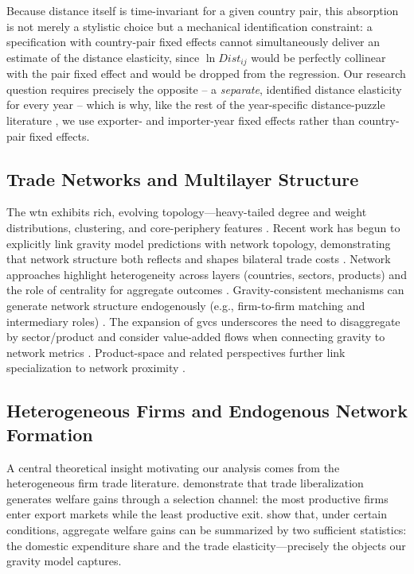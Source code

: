 \documentclass[preprint, 3p,
authoryear]{elsarticle} %
\begin{document}
Because distance itself is time-invariant for a given country pair, this
absorption is not merely a stylistic choice but a mechanical
identification constraint: a specification with country-pair fixed
effects cannot simultaneously deliver an estimate of the distance
elasticity, since \(\ln Dist_{ij}\) would be perfectly collinear with
the pair fixed effect and would be dropped from the regression. Our
research question requires precisely the opposite -- a
\textit{separate}, identified distance elasticity for every year --
which is why, like the rest of the year-specific distance-puzzle
literature \citep{disdier2008, brun2005, yotov2012distance}, we use
exporter- and importer-year fixed effects rather than country-pair fixed
effects.

\subsection{Trade Networks and Multilayer
Structure}\label{subsec:networks}

The \gls{wtn} exhibits rich, evolving topology---heavy-tailed degree and
weight distributions, clustering, and core-periphery features
\citep{fagiolo2009, garlaschelli2004, serrano2003}. Recent work has
begun to explicitly link gravity model predictions with network
topology, demonstrating that network structure both reflects and shapes
bilateral trade costs \citep{hood2017gravity}. Network approaches
highlight heterogeneity across layers (countries, sectors, products) and
the role of centrality for aggregate outcomes
\citep{debenedictis2011, barigozzi2010, cerina2015, kivela2014, opsahl2010}.
Gravity-consistent mechanisms can generate network structure
endogenously (e.g., firm-to-firm matching and intermediary roles)
\citep{chaney2014}. The expansion of \glspl{gvc} underscores the need to
disaggregate by sector/product and consider value-added flows when
connecting gravity to network metrics
\citep{johnson2012, koopman2014, antras2013, cerina2015}. Product-space
and related perspectives further link specialization to network
proximity \citep{hidalgo2009}.

\subsection{Heterogeneous Firms and Endogenous Network
Formation}\label{subsec:hetfirms}

A central theoretical insight motivating our analysis comes from the
heterogeneous firm trade literature. \citet{melitz2015new} demonstrate
that trade liberalization generates welfare gains through a selection
channel: the most productive firms enter export markets while the least
productive exit. \citet{arkolakis2012new} show that, under certain
conditions, aggregate welfare gains can be summarized by two sufficient
statistics: the domestic expenditure share and the trade
elasticity---precisely the objects our gravity model captures.
\end{document}
